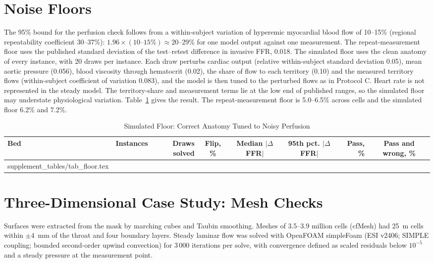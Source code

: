 \documentclass[journal,twoside,web,onecolumn]{ieeecolor}
\begin{document}
\section{Noise Floors}\label{sec:floor}
The 95\% bound for the perfusion check follows from a within-subject variation of hyperemic myocardial blood flow of 10--15\% (regional repeatability coefficient 30--37\%): $1.96 \times (10\text{--}15\%) \approx 20$--29\% for one model output against one measurement. The repeat-measurement floor uses the published standard deviation of the test--retest difference in invasive FFR, 0.018. The simulated floor
uses the clean anatomy of every instance, with 20 draws per instance. Each draw perturbs cardiac output (relative
within-subject standard deviation 0.05), mean aortic pressure (0.056), blood viscosity through hematocrit (0.02), the
share of flow to each territory (0.10) and the measured territory flows (within-subject coefficient of variation
0.083), and the model is then tuned to the perturbed flows as in Protocol C. Heart rate is not represented in the
steady model. The territory-share and measurement terms lie at the low end of published ranges, so the simulated floor
may understate physiological variation. Table~\ref{tab:floor} gives the result. The repeat-measurement floor is
5.0--6.5\% across cells and the simulated floor 6.2\% and 7.2\%.
\begin{table}[!ht]
\caption{Simulated Floor: Correct Anatomy Tuned to Noisy Perfusion}\label{tab:floor}
\centering\small
\begin{tabular}{@{}lrrcccrc@{}}
\toprule
Bed & Instances & Draws solved & Flip, \% & Median $|\Delta$FFR$|$ & 95th pct. $|\Delta$FFR$|$ & Pass, \% &
Pass and wrong, \%\\
\midrule
{} supplement_tables/tab_floor.tex 
\bottomrule
\end{tabular}
\end{table}

\FloatBarrier
\section{Three-Dimensional Case Study: Mesh Checks}\label{sec:cfd}
Surfaces were extracted from the mask by marching cubes and Taubin smoothing. Meshes of 3.5--3.9 million cells (cfMesh) had 25~\textmu m cells within $\pm 4$~mm of the throat and four boundary layers. Steady laminar flow was solved with OpenFOAM simpleFoam (ESI v2406; SIMPLE coupling; bounded second-order upwind convection) for 3\,000 iterations per solve, with convergence defined as scaled residuals below $10^{-5}$ and a steady pressure at the measurement point.
\end{document}
